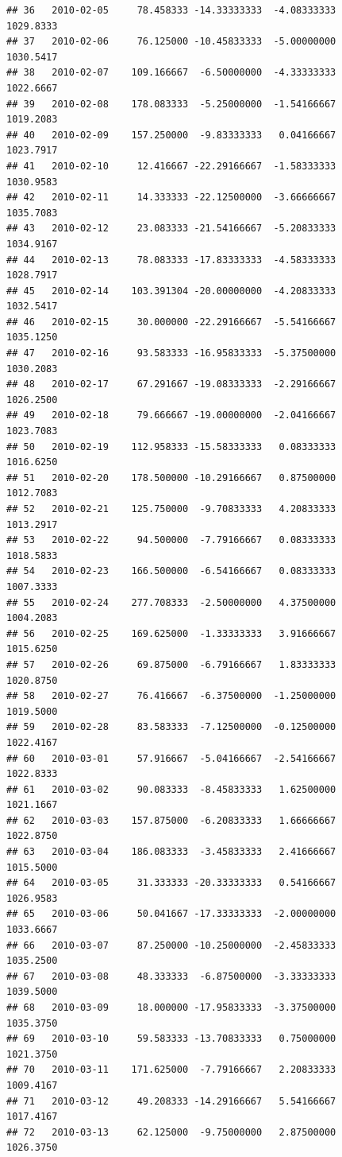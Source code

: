 \documentclass[
]{article}
\begin{document}
\begin{verbatim}
## 36   2010-02-05     78.458333 -14.33333333  -4.08333333    1029.8333
## 37   2010-02-06     76.125000 -10.45833333  -5.00000000    1030.5417
## 38   2010-02-07    109.166667  -6.50000000  -4.33333333    1022.6667
## 39   2010-02-08    178.083333  -5.25000000  -1.54166667    1019.2083
## 40   2010-02-09    157.250000  -9.83333333   0.04166667    1023.7917
## 41   2010-02-10     12.416667 -22.29166667  -1.58333333    1030.9583
## 42   2010-02-11     14.333333 -22.12500000  -3.66666667    1035.7083
## 43   2010-02-12     23.083333 -21.54166667  -5.20833333    1034.9167
## 44   2010-02-13     78.083333 -17.83333333  -4.58333333    1028.7917
## 45   2010-02-14    103.391304 -20.00000000  -4.20833333    1032.5417
## 46   2010-02-15     30.000000 -22.29166667  -5.54166667    1035.1250
## 47   2010-02-16     93.583333 -16.95833333  -5.37500000    1030.2083
## 48   2010-02-17     67.291667 -19.08333333  -2.29166667    1026.2500
## 49   2010-02-18     79.666667 -19.00000000  -2.04166667    1023.7083
## 50   2010-02-19    112.958333 -15.58333333   0.08333333    1016.6250
## 51   2010-02-20    178.500000 -10.29166667   0.87500000    1012.7083
## 52   2010-02-21    125.750000  -9.70833333   4.20833333    1013.2917
## 53   2010-02-22     94.500000  -7.79166667   0.08333333    1018.5833
## 54   2010-02-23    166.500000  -6.54166667   0.08333333    1007.3333
## 55   2010-02-24    277.708333  -2.50000000   4.37500000    1004.2083
## 56   2010-02-25    169.625000  -1.33333333   3.91666667    1015.6250
## 57   2010-02-26     69.875000  -6.79166667   1.83333333    1020.8750
## 58   2010-02-27     76.416667  -6.37500000  -1.25000000    1019.5000
## 59   2010-02-28     83.583333  -7.12500000  -0.12500000    1022.4167
## 60   2010-03-01     57.916667  -5.04166667  -2.54166667    1022.8333
## 61   2010-03-02     90.083333  -8.45833333   1.62500000    1021.1667
## 62   2010-03-03    157.875000  -6.20833333   1.66666667    1022.8750
## 63   2010-03-04    186.083333  -3.45833333   2.41666667    1015.5000
## 64   2010-03-05     31.333333 -20.33333333   0.54166667    1026.9583
## 65   2010-03-06     50.041667 -17.33333333  -2.00000000    1033.6667
## 66   2010-03-07     87.250000 -10.25000000  -2.45833333    1035.2500
## 67   2010-03-08     48.333333  -6.87500000  -3.33333333    1039.5000
## 68   2010-03-09     18.000000 -17.95833333  -3.37500000    1035.3750
## 69   2010-03-10     59.583333 -13.70833333   0.75000000    1021.3750
## 70   2010-03-11    171.625000  -7.79166667   2.20833333    1009.4167
## 71   2010-03-12     49.208333 -14.29166667   5.54166667    1017.4167
## 72   2010-03-13     62.125000  -9.75000000   2.87500000    1026.3750

\end{verbatim}
\end{document}
